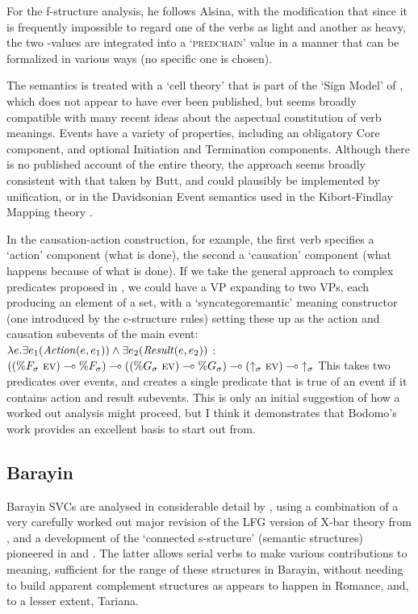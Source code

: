\documentclass[output=paper,hidelinks]{langscibook}
\begin{document}
For the f-structure analysis, he follows Alsina, with the modification that since it
is frequently impossible to regard one of the verbs as light and another as heavy,
the two {\PRED}-values are integrated into a `\textsc{predchain}' value in a manner
that can be formalized in various ways (no specific one is chosen).

The semantics is treated with a `cell theory' that is part of the `Sign Model' of
\citet{HellanVulchanova1996}, which does not appear to have ever been published, but seems
broadly compatible with many recent ideas about the aspectual constitution of verb meanings.
Events have a variety of properties, including an obligatory Core component,
and optional Initiation and Termination components.  Although there is no published
account of the entire theory, the approach seems broadly consistent with that taken
by Butt, and could plausibly be implemented by unification, or in the Davidsonian
Event semantics used in the Kibort-Findlay Mapping theory \citep{asudeh2014meaning,findlay2017mapping}.

In the causation-action construction, for example, the first verb specifies
a `action' component (what is done), the second a `causation' component (what happens
because of what is done).  If we take the general approach to complex predicates proposed
in \citet{Andrews2018shs}, we could have a VP expanding to two VPs, each producing an element
of a set, with a `syncategoremantic' meaning constructor (one introduced by the c-structure rules)
setting these up as the action and causation subevents of the main event:
\ea
{}\\[1ex]
$\lambda e. \exists e_1(\mbox{\textnormal{\textit{Action}}}(e,e_1)) \wedge\exists e_2(\mbox{\textnormal{\textit{Result}}}(e,e_2))$ :\\
$((\%F_\sigma\ \textsc{ev}{})\multimap\%F_\sigma)\multimap
  ((\%G_\sigma\ \textsc{ev}{})\multimap\%G_\sigma)\multimap
  ({\mbox{$\uparrow_\sigma$}{}}\ \textsc{ev}{})\multimap\mbox{$\uparrow_\sigma$}{}$\z
This takes two predicates over events, and creates a single
predicate that is true of an event if it contains action and result
subevents.  This is only an initial suggestion of how a worked out
analysis might proceed, but I think it demonstrates that Bodomo's work
provides an excellent basis to start out from.

\subsection{Barayin}
Barayin SVCs are analysed in considerable detail by \citet{Lovestrand2018}, using
a combination of a very carefully worked out major revision of the LFG version of X-bar theory
from \citet{BresnanEtAl2016}, and a development of the `connected s-structure'
(semantic structures) pioneered in \citet{asudeh2014meaning} and \citet{findlay2017mapping}.
The latter allows serial verbs to make various contributions to meaning, sufficient for the
range of these structures in Barayin, without needing to build apparent complement structures
as appears to happen in Romance, and, to a lesser extent, Tariana.
\end{document}
